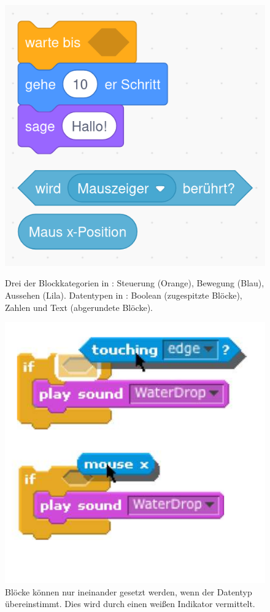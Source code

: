 \begin{figure}[!ht]
  \includegraphics[width=\linewidth]{assets/scratch-types.png}
  \caption{Drei der Blockkategorien in \Scratch{}: Steuerung (Orange), Bewegung (Blau), Aussehen (Lila). Datentypen in \Scratch{}: Boolean (zugespitzte Blöcke), Zahlen und Text (abgerundete Blöcke). }
  \label{fig:scratch-types}
  \endminipage
  \hfill
  \includegraphics[width=\linewidth]{assets/scratch-drop.png}
  \caption{Blöcke können nur ineinander gesetzt werden, wenn der Datentyp übereinstimmt. Dies wird durch einen weißen Indikator vermittelt. }
  \label{fig:scratch-drop}
  \endminipage
\end{figure}

